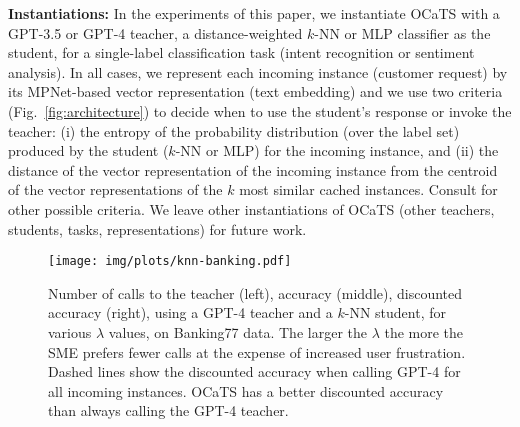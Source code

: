 \documentclass[11pt]{article}
\begin{document}
\vspace{1mm}\noindent\textbf{Instantiations:}
In the experiments of this paper, we instantiate OCaTS with a GPT-3.5 or GPT-4 teacher, a distance-weighted $k$-NN or MLP classifier as the student, for a single-label classification task (intent recognition or sentiment analysis). In all cases, we represent each incoming instance (customer request) by its MPNet-based \cite{song2020mpnet} vector representation (text embedding) and we use two criteria (Fig.~\ref{fig:architecture}) to decide when to use the student's response or invoke the teacher: (i) the entropy of the probability distribution (over the label set) produced by the student ($k$-NN or MLP) for the incoming instance, and (ii) the distance of the vector representation of the incoming instance from the centroid of the vector representations of the $k$ most similar  cached instances. Consult \citet{10.1007/s10994-021-06003-9} for other possible criteria. We leave other instantiations of OCaTS (other teachers, students, tasks, representations) for future work. 

\begin{figure*}[!htpb]
    \centering
    \texttt{[image: img/plots/knn-banking.pdf]}
    \vspace*{-7mm}
    \caption{Number of calls to the teacher (left), accuracy (middle), discounted accuracy (right), using a GPT-4 teacher and a $k$-NN student, for various $\lambda$ values, on Banking77 data. The larger the $\lambda$ the more the SME prefers fewer calls at the expense of increased user frustration. Dashed lines show the discounted accuracy when calling GPT-4 for all incoming instances. OCaTS has a better discounted accuracy than always calling the GPT-4 teacher.} 
    \label{fig:acc_calls}
    \vspace*{-3mm}
\end{figure*}
\end{document}
